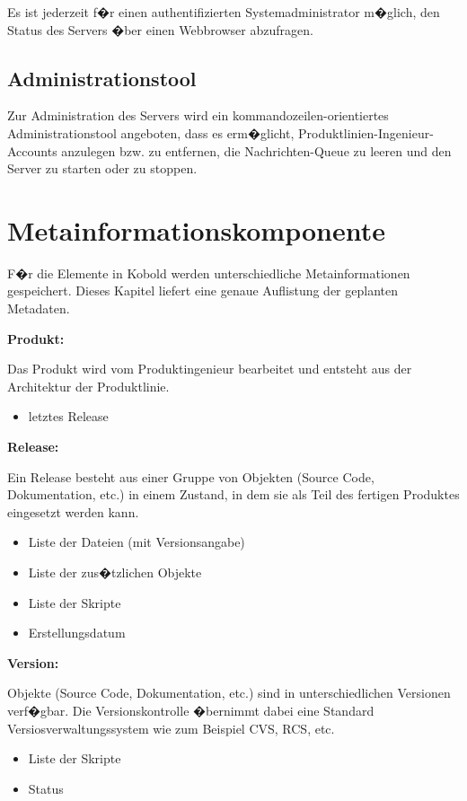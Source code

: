 Es ist jederzeit f�r einen authentifizierten Systemadministrator m�glich,
den Status des Servers �ber einen Webbrowser abzufragen.

\subsection{Administrationstool}

Zur Administration des Servers wird ein kommandozeilen-orientiertes 
Administrationstool angeboten, dass es erm�glicht, Produktlinien-Ingenieur-Accounts
anzulegen bzw. zu entfernen, die Nachrichten-Queue zu
leeren und den Server zu starten oder zu stoppen.


\section{Metainformationskomponente}

F�r die Elemente in Kobold werden unterschiedliche Metainformationen gespeichert. Dieses Kapitel liefert eine genaue Auflistung der geplanten Metadaten.\newline

\textbf{Produkt:}\par
Das Produkt wird vom Produktingenieur bearbeitet und entsteht aus der Architektur der Produktlinie. 
\begin{itemize}
\item letztes Release\newline
\end{itemize}

\textbf{Release:}\par
Ein Release besteht aus einer Gruppe von Objekten (Source Code, Dokumentation, etc.) in einem Zustand, in dem sie als Teil des fertigen Produktes eingesetzt werden kann.
\begin{itemize}
\item Liste der Dateien (mit Versionsangabe)
\item Liste der zus�tzlichen Objekte
\item Liste der Skripte
\item Erstellungsdatum\newline
\end{itemize}

\textbf{Version:}\par
Objekte (Source Code, Dokumentation, etc.) sind in unterschiedlichen Versionen verf�gbar. Die Versionskontrolle �bernimmt dabei eine Standard Versiosverwaltungssystem wie zum Beispiel CVS, RCS, etc.
\begin{itemize}
\item Liste der Skripte
\item Status\newline
\end{itemize}

